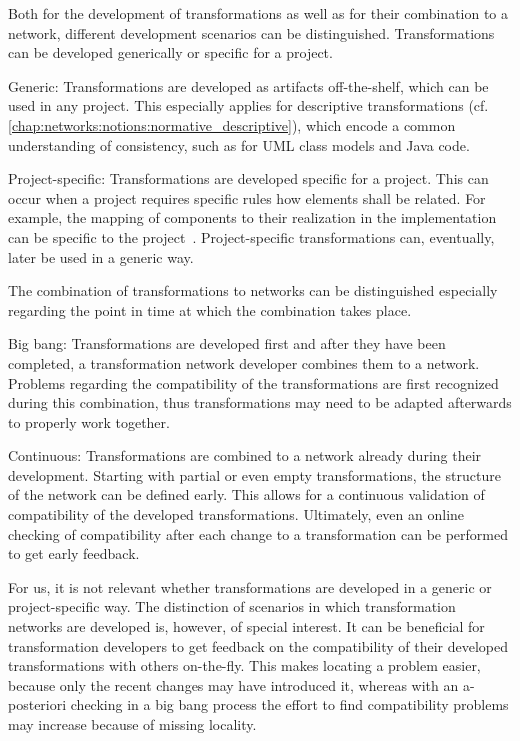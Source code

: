 Both for the development of transformations as well as for their combination to a network, different development scenarios can be distinguished.
Transformations can be developed generically or specific for a project.
\begin{properdescription}
    \item[Generic:] Transformations are developed as artifacts off-the-shelf, which can be used in any project. This especially applies for descriptive transformations (cf. \autoref{chap:networks:notions:normative_descriptive}), which encode a common understanding of consistency, such as for \gls{UML} class models and Java code.
    \item[Project-specific:] Transformations are developed specific for a project. This can occur when a project requires specific rules how elements shall be related. For example, the mapping of components to their realization in the implementation can be specific to the project~\cite{langhammer2017a}. Project-specific transformations can, eventually, later be used in a generic way.
\end{properdescription}

The combination of transformations to networks can be distinguished especially regarding the point in time at which the combination takes place.
\begin{properdescription}
    \item[Big bang:] Transformations are developed first and after they have been completed, a transformation network developer combines them to a network. Problems regarding the compatibility of the transformations are first recognized during this combination, thus transformations may need to be adapted afterwards to properly work together.
    \item[Continuous:] Transformations are combined to a network already during their development. Starting with partial or even empty transformations, the structure of the network can be defined early. This allows for a continuous validation of compatibility of the developed transformations. Ultimately, even an online checking of compatibility after each change to a transformation can be performed to get early feedback.
\end{properdescription}

For us, it is not relevant whether transformations are developed in a generic or project-specific way.
The distinction of scenarios in which transformation networks are developed is, however, of special interest.
It can be beneficial for transformation developers to get feedback on the compatibility of their developed transformations with others on-the-fly.
This makes locating a problem easier, because only the recent changes may have introduced it, whereas with an a-posteriori checking in a big bang process the effort to find compatibility problems may increase because of missing locality.

